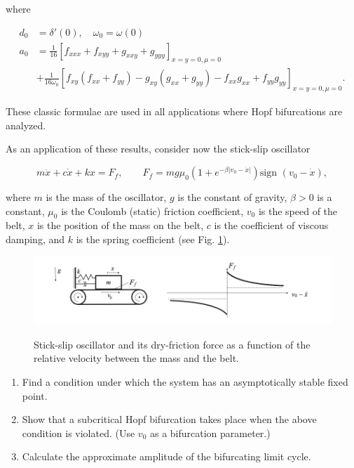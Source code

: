 \documentclass[twoside,10pt,a4paper]{article}
\begin{document}
where

\begin{align*}
d_0 &= \delta'(0), \quad \omega_0 = \omega(0) \\
a_0 &= \frac{1}{16}\left[f_{xxx}+f_{xyy}+g_{xxy}+g_{yyy} \right]_{x=y=0,\mu=0} \\
	&+ \frac{1}{16\omega_0}\left[f_{xy}(f_{xx}+f_{yy}) - g_{xy}(g_{xx} + g_{yy}) - f_{xx}g_{xx}+f_{yy}g_{yy} \right]_{x=y=0, \mu=0}.
\end{align*}

These classic formulae are used in all applications where Hopf bifurcations are analyzed.

As an application of these results, consider now the stick-slip oscillator

\begin{equation*}
m\ddot{x}+c\dot{x}+kx=F_f, \qquad F_f=mg\mu_0\left(1+e^{-\beta |v_0-\dot{x}|} \right)\text{sign }(v_0-\dot{x}),
\end{equation*}

where $m$ is the mass of the oscillator, $g$ is the constant of gravity, $\beta>0$ is a constant, $\mu_0$ is the Coulomb (static) friction coefficient, $v_0$ is the speed of the belt, $x$ is the position of the mass on the belt, $c$ is the coefficient of viscous damping, and $k$ is the spring coefficient (see Fig. \ref{fig1}).

\begin{figure}[h!]
\includegraphics[width = \textwidth]{Graphics/hopf.png}\label{fig1}
\caption{Stick-slip oscillator and its dry-friction force as a function of the relative velocity between the mass and the belt.}
\label{fig1}
\end{figure}
\begin{enumerate}[label=(\alph*)]
\item Find a condition under which the system has an asymptotically stable fixed point.
\item Show that a subcritical Hopf bifurcation takes place when the above condition is violated. (Use $v_0$ as a bifurcation parameter.)
\item Calculate the approximate amplitude of the bifurcating limit cycle.
\end{enumerate}
\end{document}
